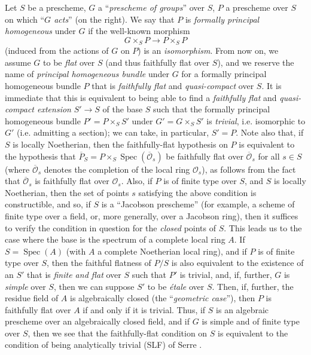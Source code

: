 \documentclass{article}
\theoremstyle{plain}
\theoremstyle{definition}
\newcommand{\sh}[1]{{\mathscr{#1}}}
\DeclareMathOperator{\Spec}{Spec}
\newcommand{\oldpage}[1]{\marginpar{\footnotesize$\Big\vert$ \textit{p.~#1}}}
\begin{document}
Let $S$ be a prescheme, $G$ a ``\emph{prescheme of groups}'' over $S$, $P$ a prescheme over $S$ on which ``\emph{$G$ acts}'' (on the right).
We say that $P$ is \emph{formally principal homogeneous} under $G$ if the well-known morphism
\[
  G\times_S P \to P\times_S P
\]
\oldpage{190-27}
(induced from the actions of $G$ on $P$) is an \emph{isomorphism}.
From now on, we assume $G$ to be \emph{flat} over $S$ (and thus faithfully flat over $S$), and we reserve the name of \emph{principal homogeneous bundle} under $G$ for a formally principal homogeneous bundle $P$ that is \emph{faithfully flat} and \emph{quasi-compact} over $S$.
It is immediate that this is equivalent to being able to find a \emph{faithfully flat} and \emph{quasi-compact extension} $S'\to S$ of the base $S$ such that the formally principal homogeneous bundle $P'=P\times_S S'$ under $G'=G\times_S S'$ is \emph{trivial}, i.e. isomorphic to $G'$ (i.e. admitting a section);
we can take, in particular, $S'=P$.
Note also that, if $S$ is locally Noetherian, then the faithfully-flat hypothesis on $P$ is equivalent to the hypothesis that $\overline{P}_S=P\times_S\Spec(\overline{\sh{O}}_s)$ be faithfully flat over $\overline{\sh{O}}_s$ for all $s\in S$ (where $\overline{\sh{O}}_s$ denotes the completion of the local ring $\sh{O}_s$), as follows from the fact that $\overline{\sh{O}}_s$ is faithfully flat over $\sh{O}_s$.
Also, if $P$ is of finite type over $S$, and $S$ is locally Noetherian, then the set of points $s$ satisfying the above condition is constructible, and so, if $S$ is a ``Jacobson prescheme'' (for example, a scheme of finite type over a field, or, more generally, over a Jacobson ring), then it suffices to verify the condition in question for the \emph{closed} points of $S$.
This leads us to the case where the base is the spectrum of a complete local ring $A$.
If $S=\Spec(A)$ (with $A$ a complete Noetherian local ring), and if $P$ is of finite type over $S$, then the faithful flatness of $P/S$ is also equivalent to the existence of an $S'$ that is \emph{finite and flat} over $S$ such that $P'$ is trivial, and, if, further, $G$ is \emph{simple} over $S$, then we can suppose $S'$ to be \emph{\'{e}tale} over $S$.
Then, if, further, the residue field of $A$ is algebraically closed (the ``\emph{geometric case}''), then $P$ is faithfully flat over $A$ if and only if it is trivial.
Thus, if $S$ is an algebraic prescheme over an algebraically closed field, and if $G$ is simple and of finite type over $S$, then we see that the faithfully-flat condition on $S$ is equivalent to the condition of being analytically trivial (SLF) of Serre \cite[p.~1--12]{6}.
\end{document}
